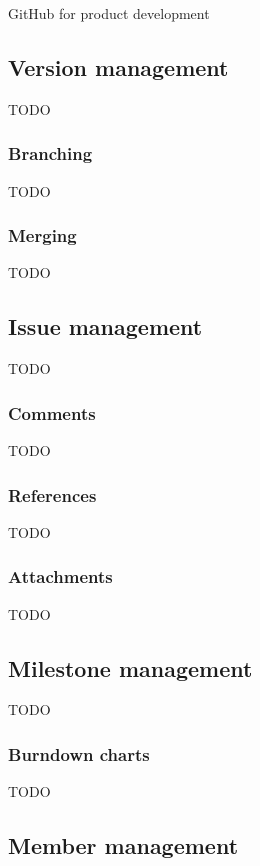 \documentclass[numbers,sort&compress]{IntechOpen-Book}%
\begin{document}
GitHub for product development~\cite{Hackenberg_2023}

\subsection{Version management}

TODO

\subsubsection*{Branching}

TODO

\subsubsection*{Merging}

TODO

\subsection{Issue management}

TODO

\subsubsection*{Comments}

TODO

\subsubsection*{References}

TODO

\subsubsection*{Attachments}

TODO

\subsection{Milestone management}

TODO

\subsubsection*{Burndown charts}

TODO

\subsection{Member management}
\end{document}
